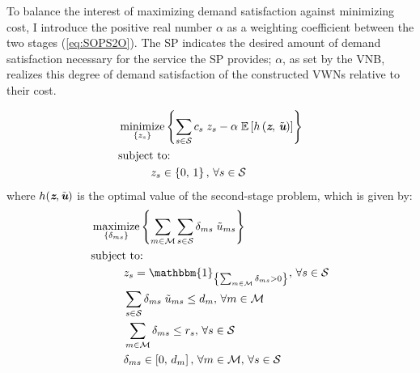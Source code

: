 \documentclass[12pt,dvipsnames]{report}
\newcommand{\ind}[1]{\mathbbm{1}_{\left\{ #1 \right\}}}
\DeclareMathOperator*{\argmin}{minimize}
\DeclareMathOperator*{\argmax}{maximize}
\begin{document}
To balance the interest of maximizing demand satisfaction against minimizing cost, I introduce the positive real number $\alpha$ as a weighting coefficient between the two stages (\cref{eq:SOPS2O}).  The SP indicates the desired amount of demand satisfaction necessary for the service the SP provides; $\alpha$, as set by the VNB, realizes this degree of demand satisfaction of the constructed VWNs relative to their cost.

\begin{tcolorbox}[floatplacement = !ht, float, title = Two-Stage Stochastic Optimization Program for BS Selection and Adaptive Slicing]
\begin{align}
& \argmin_{\left\{ z_s \right\}} \left\{ \sum_{s \in \mathcal{S}} c_s \; z_s - \alpha \; \mathbb{E}\left[ h\left( \textit{\textbf{z}},\, \tilde{\textit{\textbf{u}}} \right) \right] \right\} \label{eq:SOPS1O}\\
& \text{subject to:}  \nonumber \\
& \hspace{0.4in} z_s \in \left\{ 0,\, 1 \right\},\, \forall s \in \mathcal{S} \label{eq:SOPS1C1}
\end{align}
where $h(\textit{\textbf{z}}, \tilde{\textit{\textbf{u}}})$ is the optimal value of the second-stage problem, which is given by:
\begin{align}
& \argmax_{\left\{ \delta_{ms} \right\}} \left\{ \sum_{m \in \mathcal{M}} \sum_{s \in \mathcal{S}} \delta_{ms} \; \tilde{u}_{ms} \right\} \label{eq:SOPS2O}\\
& \text{subject to:}  \nonumber \\
& \hspace{0.4in} z_s = \ind{\sum_{m \in \mathcal{M}} \delta_{ms} > 0},\, \forall s \in \mathcal{S} \label{eq:SOPS2C1}\\
& \hspace{0.4in} \sum_{s \in \mathcal{S}} \delta_{ms} \; \tilde{u}_{ms} \leq d_m,\, \forall m \in \mathcal{M} \label{eq:SOPS2C2}\\
& \hspace{0.4in} \sum_{m \in \mathcal{M}} \delta_{ms} \leq r_s,\, \forall s \in \mathcal{S} \label{eq:SOPS2C3}\\
& \hspace{0.4in} \delta_{ms} \in \left[ 0,\, d_m \right],\, \forall m \in \mathcal{M},\, \forall s \in \mathcal{S} \label{eq:SOPS2C4}
\end{align}
\end{tcolorbox}
\end{document}
